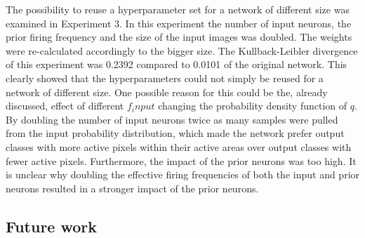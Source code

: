 The possibility to reuse a hyperparameter set for a network of different size was examined in Experiment 3. In this experiment the number of input neurons, the prior firing frequency and the size of the input images was doubled. The weights were re-calculated accordingly to the bigger size. The Kullback-Leibler divergence of this experiment was 0.2392 compared to 0.0101 of the original network. This clearly showed that the hyperparameters could not simply be reused for a network of different size. One possible reason for this could be the, already discussed, effect of different $f_input$ changing the probability density function of $q$. By doubling the number of input neurons twice as many samples were pulled from the input probability distribution, which made the network prefer output classes with more active pixels within their active areas over output classes with fewer active pixels. Furthermore, the impact of the prior neurons was too high. It is unclear why doubling the effective firing frequencies of both the input and prior neurons resulted in a stronger impact of the prior neurons.





\subsection{Future work}


